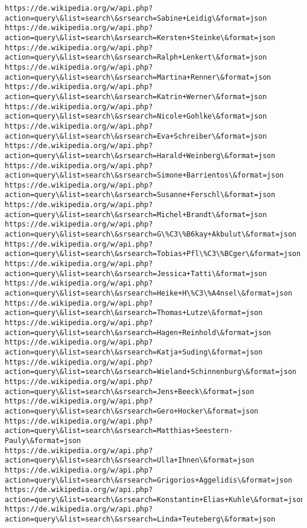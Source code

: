 \documentclass[11pt]{article}
\begin{document}
\begin{Verbatim}[commandchars=\\\{\}]
https://de.wikipedia.org/w/api.php?action=query\&list=search\&srsearch=Sabine+Leidig\&format=json
https://de.wikipedia.org/w/api.php?action=query\&list=search\&srsearch=Kersten+Steinke\&format=json
https://de.wikipedia.org/w/api.php?action=query\&list=search\&srsearch=Ralph+Lenkert\&format=json
https://de.wikipedia.org/w/api.php?action=query\&list=search\&srsearch=Martina+Renner\&format=json
https://de.wikipedia.org/w/api.php?action=query\&list=search\&srsearch=Katrin+Werner\&format=json
https://de.wikipedia.org/w/api.php?action=query\&list=search\&srsearch=Nicole+Gohlke\&format=json
https://de.wikipedia.org/w/api.php?action=query\&list=search\&srsearch=Eva+Schreiber\&format=json
https://de.wikipedia.org/w/api.php?action=query\&list=search\&srsearch=Harald+Weinberg\&format=json
https://de.wikipedia.org/w/api.php?action=query\&list=search\&srsearch=Simone+Barrientos\&format=json
https://de.wikipedia.org/w/api.php?action=query\&list=search\&srsearch=Susanne+Ferschl\&format=json
https://de.wikipedia.org/w/api.php?action=query\&list=search\&srsearch=Michel+Brandt\&format=json
https://de.wikipedia.org/w/api.php?action=query\&list=search\&srsearch=G\%C3\%B6kay+Akbulut\&format=json
https://de.wikipedia.org/w/api.php?action=query\&list=search\&srsearch=Tobias+Pfl\%C3\%BCger\&format=json
https://de.wikipedia.org/w/api.php?action=query\&list=search\&srsearch=Jessica+Tatti\&format=json
https://de.wikipedia.org/w/api.php?action=query\&list=search\&srsearch=Heike+H\%C3\%A4nsel\&format=json
https://de.wikipedia.org/w/api.php?action=query\&list=search\&srsearch=Thomas+Lutze\&format=json
https://de.wikipedia.org/w/api.php?action=query\&list=search\&srsearch=Hagen+Reinhold\&format=json
https://de.wikipedia.org/w/api.php?action=query\&list=search\&srsearch=Katja+Suding\&format=json
https://de.wikipedia.org/w/api.php?action=query\&list=search\&srsearch=Wieland+Schinnenburg\&format=json
https://de.wikipedia.org/w/api.php?action=query\&list=search\&srsearch=Jens+Beeck\&format=json
https://de.wikipedia.org/w/api.php?action=query\&list=search\&srsearch=Gero+Hocker\&format=json
https://de.wikipedia.org/w/api.php?action=query\&list=search\&srsearch=Matthias+Seestern-Pauly\&format=json
https://de.wikipedia.org/w/api.php?action=query\&list=search\&srsearch=Ulla+Ihnen\&format=json
https://de.wikipedia.org/w/api.php?action=query\&list=search\&srsearch=Grigorios+Aggelidis\&format=json
https://de.wikipedia.org/w/api.php?action=query\&list=search\&srsearch=Konstantin+Elias+Kuhle\&format=json
https://de.wikipedia.org/w/api.php?action=query\&list=search\&srsearch=Linda+Teuteberg\&format=json

\end{Verbatim}
\end{document}
